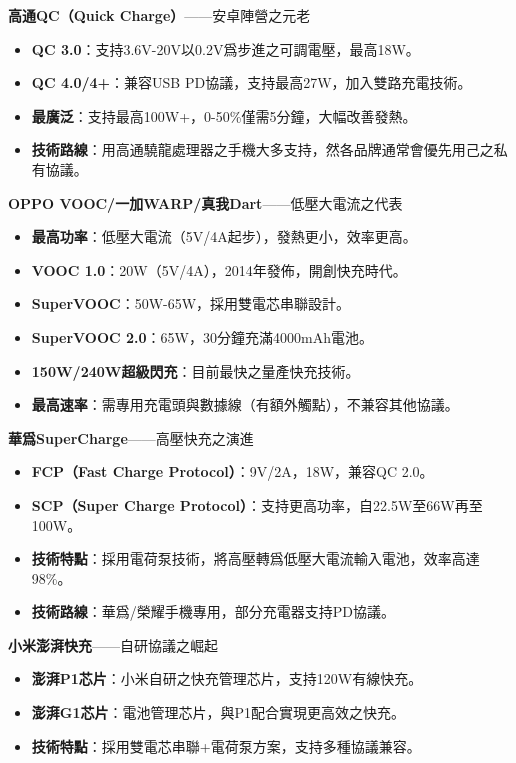 \textbf{高通QC（Quick Charge）}——安卓陣營之元老

\begin{itemize}
  \item \textbf{QC 3.0}：支持3.6V-20V以0.2V爲步進之可調電壓，最高18W。
  \item \textbf{QC 4.0/4+}：兼容USB PD協議，支持最高27W，加入雙路充電技術。
  \item \textbf{最廣泛}：支持最高100W+，0-50\%僅需5分鐘，大幅改善發熱。
  \item \textbf{技術路線}：用高通驍龍處理器之手機大多支持，然各品牌通常會優先用己之私有協議。
\end{itemize}

\textbf{OPPO VOOC/一加WARP/真我Dart}——低壓大電流之代表

\begin{itemize}
  \item \textbf{最高功率}：低壓大電流（5V/4A起步），發熱更小，效率更高。
  \item \textbf{VOOC 1.0}：20W（5V/4A），2014年發佈，開創快充時代。
  \item \textbf{SuperVOOC}：50W-65W，採用雙電芯串聯設計。
  \item \textbf{SuperVOOC 2.0}：65W，30分鐘充滿4000mAh電池。
  \item \textbf{150W/240W超級閃充}：目前最快之量產快充技術。
  \item \textbf{最高速率}：需專用充電頭與數據線（有額外觸點），不兼容其他協議。
\end{itemize}

\textbf{華爲SuperCharge}——高壓快充之演進

\begin{itemize}
  \item \textbf{FCP（Fast Charge Protocol）}：9V/2A，18W，兼容QC 2.0。
  \item \textbf{SCP（Super Charge Protocol）}：支持更高功率，自22.5W至66W再至100W。
  \item \textbf{技術特點}：採用電荷泵技術，將高壓轉爲低壓大電流輸入電池，效率高達98\%。
  \item \textbf{技術路線}：華爲/榮耀手機專用，部分充電器支持PD協議。
\end{itemize}

\textbf{小米澎湃快充}——自研協議之崛起

\begin{itemize}
  \item \textbf{澎湃P1芯片}：小米自研之快充管理芯片，支持120W有線快充。
  \item \textbf{澎湃G1芯片}：電池管理芯片，與P1配合實現更高效之快充。
  \item \textbf{技術特點}：採用雙電芯串聯+電荷泵方案，支持多種協議兼容。
\end{itemize}

